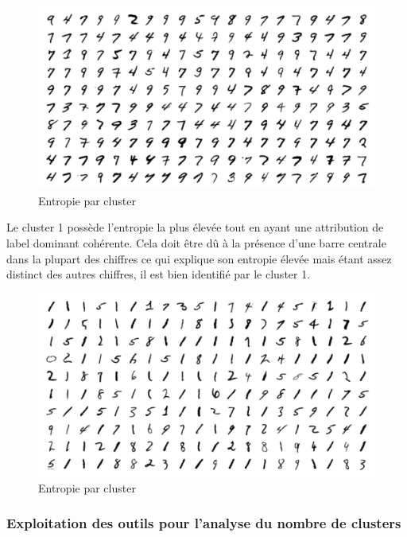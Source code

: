 \documentclass[french,a4paper,18pt]{article}
\begin{document}
\begin{figure}[h!]
    \centering
    \includegraphics[scale=0.3]{../images/mnist_kmeans_confusion_high_entropy_cluster.png}
    \caption{Entropie par cluster}\label{fig:mnist_kmeans_entropy}
\end{figure}

Le cluster 1 possède l'entropie la plus élevée tout en ayant une attribution de label dominant cohérente.
Cela doit être dû à la présence d'une barre centrale dans la plupart des chiffres ce qui explique 
son entropie élevée mais étant assez distinct des autres chiffres, il est bien identifié par le cluster 1.

\begin{figure}[h!]
    \centering
    \includegraphics[scale=0.3]{../images/mnist_kmeans_high_entropy_cluster.png}
    \caption{Entropie par cluster}\label{fig:mnist_kmeans_entropy}
\end{figure}

\subsubsection{Exploitation des outils pour l'analyse du nombre de clusters}
\end{document}
